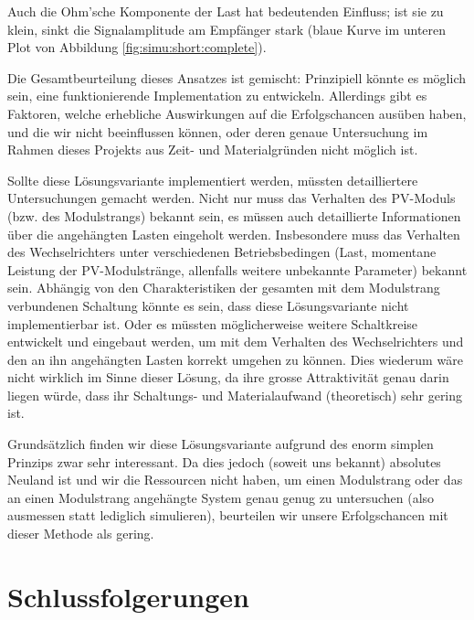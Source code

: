 Auch die  Ohm'sche Komponente der  Last hat  bedeutenden Einfluss; ist  sie zu
klein, sinkt die Signalamplitude am  Empf\"anger stark (blaue Kurve im unteren
Plot von Abbildung \ref{fig:simu:short:complete}).

Die Gesamtbeurteilung  dieses Ansatzes  ist gemischt: Prinzipiell  k\"onnte es
m\"oglich sein, eine  funktionierende Implementation zu entwickeln. Allerdings
gibt  es  Faktoren,  welche  erhebliche Auswirkungen  auf  die  Erfolgschancen
aus\"uben haben,  und die wir  nicht beeinflussen k\"onnen, oder  deren genaue
Untersuchung im Rahmen  dieses Projekts aus Zeit-  und Materialgr\"unden nicht
m\"oglich ist.

Sollte   diese   L\"osungsvariante   implementiert  werden,   m\"ussten
detailliertere Untersuchungen  gemacht werden. Nicht nur muss  das Verhalten des
PV-Moduls (bzw. des Modulstrangs) bekannt  sein, es m\"ussen auch detaillierte
Informationen \"uber die angeh\"angten  Lasten eingeholt werden.  Insbesondere
muss das  Verhalten des  Wechselrichters unter  verschiedenen Betriebsbedingen
(Last,   momentane   Leistung   der  PV-Modulstr\"ange,   allenfalls   weitere
unbekannte  Parameter)  bekannt   sein. Abh\"angig  von  den  Charakteristiken
der  gesamten mit  dem  Modulstrang verbundenen  Schaltung  k\"onnte es  sein,
dass  diese L\"osungsvariante  nicht  implementierbar  ist. Oder es  m\"ussten
m\"oglicherweise weitere Schaltkreise entwickelt  und eingebaut werden, um mit
dem Verhalten des Wechselrichters und  den an ihn angeh\"angten Lasten korrekt
umgehen  zu k\"onnen. Dies  wiederum  w\"are nicht  wirklich  im Sinne  dieser
L\"osung, da ihre grosse Attraktivit\"at  genau darin liegen w\"urde, dass ihr
Schaltungs- und Materialaufwand (theoretisch) sehr gering ist.

Grunds\"atzlich finden wir diese  L\"osungsvariante aufgrund des enorm simplen
Prinzips zwar sehr interessant. Da dies  jedoch (soweit uns bekannt) absolutes
Neuland ist und wir die Ressourcen  nicht haben, um einen Modulstrang oder das
an  einen Modulstrang  angeh\"angte System  genau genug  zu untersuchen  (also
ausmessen statt  lediglich simulieren),  beurteilen wir  unsere Erfolgschancen
mit dieser Methode als gering.


\clearpage
\section{Schlussfolgerungen}
\label{subsec:simu:conclusion}

